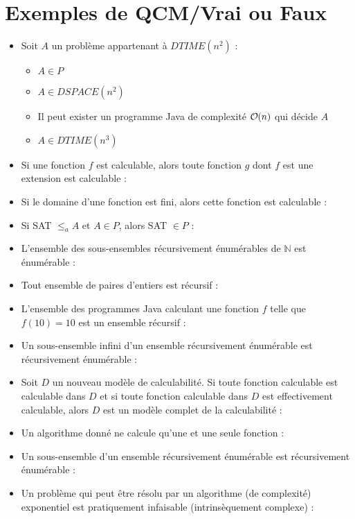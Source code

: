 \chapter{Exemples de QCM/Vrai ou Faux}

\begin{itemize}
\item Soit $A$ un problème appartenant à $DTIME(n^2)$ : %
	\begin{itemize}
	\item $A \in P$
	\item $A \in DSPACE (n^2)$
	\item Il peut exister un programme Java de complexité $\bigO(n)$ qui décide $A$
	\item $A \in DTIME(n^3)$
	\end{itemize}
\item Si une fonction $f$ est calculable, alors toute fonction $g$ dont $f$ est une extension est calculable :  %
\item Si le domaine d’une fonction est fini, alors cette fonction est calculable :  %
\item Si SAT $\leq_a A$ et $A \in P$, alors SAT $\in P$  :  %
\item L’ensemble des sous-ensembles récursivement énumérables de $\mathbb{N}$ est énumérable :  %
\item Tout ensemble de paires d’entiers est récursif :  %
\item L’ensemble des programmes Java calculant une fonction $f$ telle que $f(10)=10$ est un ensemble récursif :  %
\item Un sous-ensemble infini d’un ensemble récursivement énumérable est récursivement énumérable :  %
\item Soit $D$ un nouveau modèle de calculabilité. Si toute fonction calculable est calculable dans $D$ et si toute fonction calculable dans $D$ est effectivement calculable, alors $D$ est un modèle complet de la calculabilité :  %
\item Un algorithme donné ne calcule qu’une et une seule fonction  :  %
\item Un sous-ensemble d’un ensemble récursivement énumérable est récursivement énumérable :  %
\item Un problème qui peut être résolu par un algorithme (de complexité) exponentiel est pratiquement infaisable (intrinsèquement complexe) :  %

\end{itemize}
